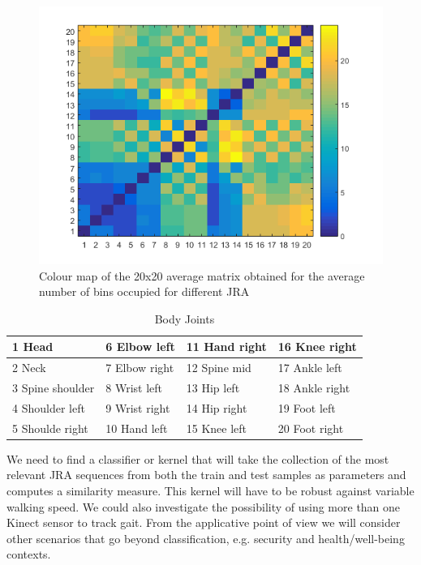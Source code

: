\begin{figure}[h]
\centering
\includegraphics[scale=0.8]{coldmap.png}
\caption{Colour map of the 20x20 average matrix obtained for the average number of bins occupied for different JRA}
\end{figure}

\def\arraystretch{1.3}
\begin{table}[h]
\centering
\begin{tabular}{| p{3cm}| p{3cm}|p{3cm}| p{3cm}|}
 \hline
1 Head & 6 Elbow left & 11 Hand right & 16 Knee right  \\ \hline
2 Neck & 7 Elbow right & 12 Spine mid & 17 Ankle left  \\ \hline
3 Spine shoulder & 8 Wrist left & 13 Hip left & 18 Ankle right \\\hline
4 Shoulder left & 9 Wrist right & 14 Hip right & 19 Foot left \\ \hline
5 Shoulde right & 10 Hand left & 15 Knee left & 20 Foot right \\ \hline
\end{tabular}
\caption{ Body Joints}
\end{table}

\newpage
\noindent We need to find a classifier or kernel that will take the collection of the most relevant JRA sequences from both the train and test samples as parameters and computes a similarity measure. This kernel will have to be robust against variable walking speed.
We could also investigate the possibility of using more than one Kinect sensor to track gait. From the applicative point of view we will consider other scenarios that go beyond classification, e.g. security and health/well-being contexts.
